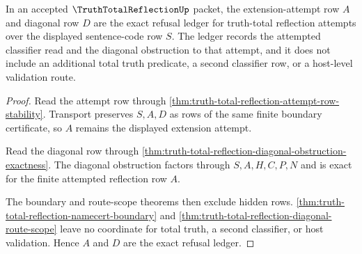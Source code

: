 \begin{theorem}
\label{thm:truth-total-reflection-refusal-ledger-exactness}
In an accepted $\TruthTotalReflectionUp$ packet, the extension-attempt row $A$ and diagonal row $D$ are the exact refusal ledger for truth-total reflection attempts over the displayed sentence-code row $S$. The ledger records the attempted classifier read and the diagonal obstruction to that attempt, and it does not include an additional total truth predicate, a second classifier row, or a host-level validation route.
\end{theorem}
\begin{proof}
Read the attempt row through \autoref{thm:truth-total-reflection-attempt-row-stability}. Transport preserves $S,A,D$ as rows of the same finite boundary certificate, so $A$ remains the displayed extension attempt.

Read the diagonal row through \autoref{thm:truth-total-reflection-diagonal-obstruction-exactness}. The diagonal obstruction factors through $S,A,H,C,P,N$ and is exact for the finite attempted reflection row $A$.

The boundary and route-scope theorems then exclude hidden rows. \autoref{thm:truth-total-reflection-namecert-boundary} and \autoref{thm:truth-total-reflection-diagonal-route-scope} leave no coordinate for total truth, a second classifier, or host validation. Hence $A$ and $D$ are the exact refusal ledger.
\end{proof}

